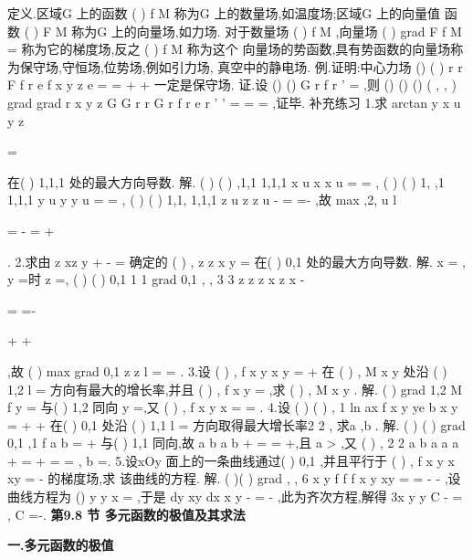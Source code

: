 \textcolor{lyred}{定义}.区域G 上的函数
(
)
f M 称为G 上的\textcolor{lyred}{数量场},如温度场;区域G 上的向量值 
函数
(
)
F M
\rho 
称为G 上的\textcolor{lyred}{向量场},如力场. 
对于数量场
(
)
f M ,向量场
(
)
grad
F
f M
=
\rho 
称为它的\textcolor{lyred}{梯度场},反之
(
)
f M 称为这个 
向量场的\textcolor{lyred}{势函数},具有势函数的向量场称为\textcolor{lyred}{保守场},\textcolor{lyred}{守恒场},\textcolor{lyred}{位势场},例如引力场, 
真空中的静电场. 
\textcolor{lyred}{例}.证明:中心力场
()
(
)
r
r
F
f r e
f
x
y
z
e
=
=
+
+
\rho 
\rho 
\rho 一定是保守场. 
证.设
()
()
G r
f r
'
=
,则
()
()
()
( , , )
grad
grad
r
x y z
G
G r
r
G r
f r e
r
'
'
=
=
=
\rho ,证毕. 
\textcolor{lyred}{补充练习 }
1.求
arctan
y
x
u
y
z


=




在(
)
1,1,1 处的最大方向导数. 
解. (
)
(
)
,1,1
1,1,1
x
u x
x
u
\pi 
\pi 
=
\Rightarrow 
=
, (
)
(
)
1, ,1
1,1,1
y
u
y
y
u
=
\Rightarrow 
=
, 
(
)
(
)
1,1,
1,1,1
z
u
z
z
u
\pi 
\pi 
-
=
\Rightarrow 
=-
,故
max
,2,
u
l
\pi 
\pi 
\pi 
\partial 


=
-
=
+


\partial 


. 
2.求由
z
xz
y
+
-
=
确定的
(
)
,
z
z x y
=
在(
)
0,1 处的最大方向导数. 
解.
x =
,
y =时
z =,
(
)
(
)
0,1
1 1
grad
0,1
,
,
3 3
z
z
z
x
z
x
-




=
=-




+
+




,故 
(
)
max
grad
0,1
z
z
l
\partial =
=
\partial 
. 
3.设
(
)
,
f x y
x
y
=
+
在
(
)
,
M x
y
处沿
(
)
1,2
l =
\rho 
方向有最大的增长率,并且 
(
)
,
f x
y
=
,求
(
)
,
M x
y
. 
解.
(
)
grad
1,2
M
f
y
=
与(
)
1,2 同向
y
\Rightarrow 
=,又
(
)
,
f x
y
x
=
\Rightarrow 
=
. 
4.设
(
)
(
)
,
1 ln
ax
f x y
ye
b x
y
=
+
+
在(
)
0,1 处沿
(
)
1,1
l =
\rho 
方向取得最大增长率2 2 , 
求a ,b . 
解.
(
)
(
)
grad
0,1
,1
f
a
b
=
+
与(
)
1,1 同向,故
a
b
a
b
+
=
\Rightarrow 
=
+,且
a >
,又 
(
)
,
2 2
a b
a
a
a
+
=
\Rightarrow 
+
=
\Rightarrow 
=
,
b =. 
5.设xOy 面上的一条曲线通过(
)
0,1 ,并且平行于
(
)
,
f x y
x
xy
=
-
的梯度场,求 
该曲线的方程. 
解.
(
)(
)
grad
,
, 6
x
y
f
f
f
x
y
xy
=
=
-
-
,设曲线方程为
()
y
y x
=
,于是 
dy
xy
dx
x
y
-
=
-
,此为齐次方程,解得
3x y
y
C
-
=
,
C =-. 
\vspace{6pt}
{\large \bfseries \textcolor{lyred}{第9.8 节 多元函数的极值及其求法}}

\vspace{4pt}
{\bfseries \textcolor{lyred}{一.多元函数的极值}}

